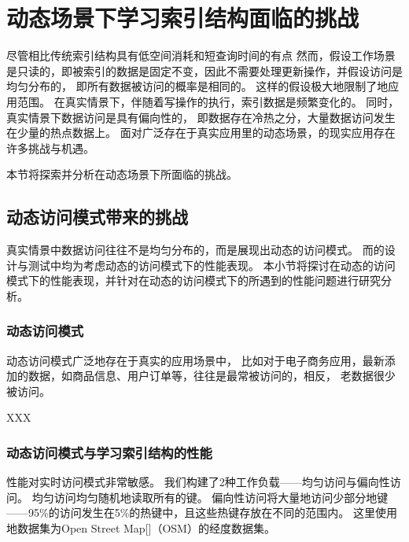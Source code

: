 \chapter{动态场景下学习索引结构面临的挑战}
\label{chap:challenge}

尽管{\li}相比传统索引结构具有低空间消耗和短查询时间的有点
然而，{\li}假设工作场景是只读的，即被索引的数据是固定不变，因此不需要处理更新操作，并假设访问是均匀分布的，
即所有数据被访问的概率是相同的。
这样的假设极大地限制了{\li}地应用范围。
在真实情景下，伴随着写操作的执行，索引数据是频繁变化的。
同时，真实情景下数据访问是具有偏向性的，
即数据存在冷热之分，大量数据访问发生在少量的热点数据上。
面对广泛存在于真实应用里的动态场景，{\li}的现实应用存在许多挑战与机遇。

本节将探索并分析{\li}在动态场景下所面临的挑战。

\section{动态访问模式带来的挑战}

真实情景中数据访问往往不是均匀分布的，而是展现出动态的访问模式。
而{\li}的设计与测试中均为考虑动态的访问模式下的性能表现。
本小节将探讨{\li}在动态的访问模式下的性能表现，并针对{\li}在动态的访问模式下的所遇到的性能问题进行研究分析。

\subsection{动态访问模式}

动态访问模式广泛地存在于真实的应用场景中，
比如对于电子商务应用，最新添加的数据，如商品信息、用户订单等，往往是最常被访问的，相反，
老数据很少被访问。

XXX

\subsection{动态访问模式与学习索引结构的性能}

{\li}性能对实时访问模式非常敏感。
我们构建了2种工作负载{------}均匀访问与偏向性访问。
均匀访问均匀随机地读取所有的键。
偏向性访问将大量地访问少部分地键{------}95\%的访问发生在5\%的热键中，且这些热键存放在不同的范围内。
这里使用地数据集为Open Street Map[]（OSM）的经度数据集。


